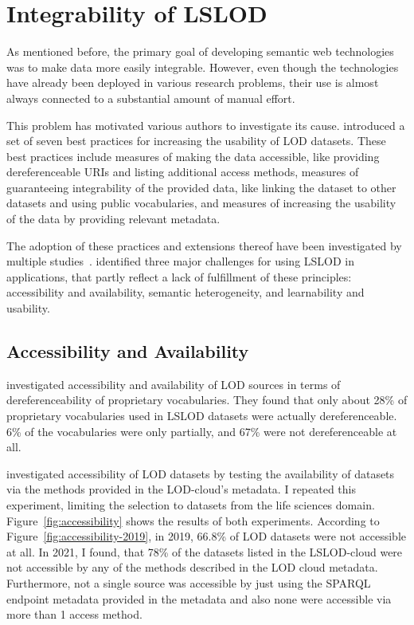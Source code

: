 \documentclass[runningheads]{llncs}
\begin{document}
    \section{Integrability of LSLOD}
    As mentioned before, the primary goal of developing semantic web technologies was to make data more easily integrable.
    However, even though the technologies have already been deployed in various research problems, their use is almost always connected to a substantial amount of manual effort.

    This problem has motivated various authors to investigate its cause.
    \citet{heath2011linked} introduced a set of seven best practices for increasing the usability of LOD datasets.
    These best practices include measures of making the data accessible, like providing dereferenceable URIs and listing additional access methods, measures of guaranteeing integrability of the provided data, like linking the dataset to other datasets and using public vocabularies, and measures of increasing the usability of the data by providing relevant metadata.

    The adoption of these practices and extensions thereof have been investigated by multiple studies~\citep{schmachtenberg2014adoption, debattista2018evaluating, debattista2019lod}.
    \citet{kamdar2019enabling} identified three major challenges for using LSLOD in applications, that partly reflect a lack of fulfillment of these principles: accessibility and availability, semantic heterogeneity, and learnability and usability.

    \subsection{Accessibility and Availability}
    \citet{schmachtenberg2014adoption} investigated accessibility and availability of LOD sources in terms of dereferenceability of proprietary vocabularies.
    They found that only about 28\% of proprietary vocabularies used in LSLOD datasets were actually dereferenceable.
    6\% of the vocabularies were only partially, and 67\% were not dereferenceable at all.

    \citet{debattista2019lod} investigated accessibility of LOD datasets by testing the availability of datasets via the methods provided in the LOD-cloud's metadata.
    I repeated this experiment, limiting the selection to datasets from the life sciences domain.
    Figure~\ref{fig:accessibility} shows the results of both experiments.
    According to Figure~\ref{fig:accessibility-2019}, in 2019, 66.8\% of LOD datasets were not accessible at all.
    In 2021, I found, that 78\% of the datasets listed in the LSLOD-cloud were not accessible by any of the methods described in the LOD cloud metadata.
    Furthermore, not a single source was accessible by just using the SPARQL endpoint metadata provided in the metadata and also none were accessible via more than 1 access method.
\end{document}
